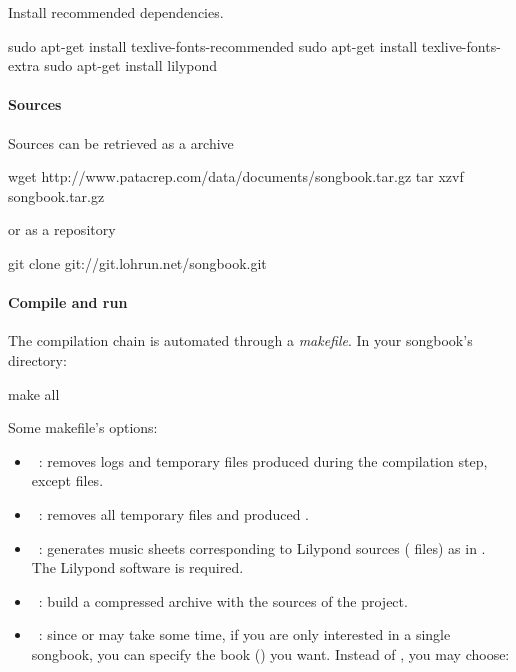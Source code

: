 Install recommended dependencies.
\begin{unix}
  sudo apt-get install texlive-fonts-recommended
  sudo apt-get install texlive-fonts-extra
  sudo apt-get install lilypond
\end{unix}

\paragraph{Sources}

Sources can be retrieved as a  archive
\begin{unix}
  wget http://www.patacrep.com/data/documents/songbook.tar.gz
  tar xzvf songbook.tar.gz
\end{unix}

or as a \git repository

\begin{unix}
  git clone git://git.lohrun.net/songbook.git
\end{unix}

\paragraph{Compile and run}

The compilation chain is automated through a \emph{makefile}. In your
songbook's directory:

\begin{unix}
  make all
\end{unix}

Some makefile's options:
\begin{itemize}
\item {}~: removes logs and temporary files
  produced during the compilation step, except  files.
\item {}~: removes all temporary files and
  produced .
\item {}~: generates music sheets
  corresponding to Lilypond sources ( files) as  in
  . The Lilypond software is required.
\item {}~: build a compressed archive
   with the sources of the project.
\item {}~: since  or
   may take some time, if you are only interested in a
  single songbook, you can specify the book () you
  want. Instead of , you may choose:
\end{itemize}

